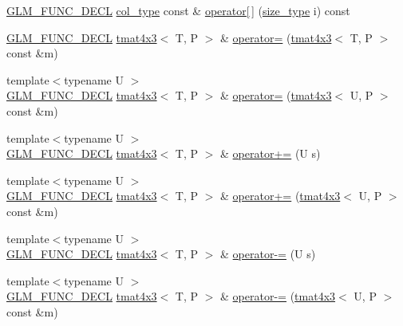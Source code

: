 \begin{DoxyCompactItemize}
\item 
\hyperlink{setup_8hpp_ab2d052de21a70539923e9bcbf6e83a51}{G\+L\+M\+\_\+\+F\+U\+N\+C\+\_\+\+D\+E\+CL} \hyperlink{structglm_1_1detail_1_1tmat4x3_a58afd510f7ab968e5a86e20f2f3979de}{col\+\_\+type} const  \& \hyperlink{structglm_1_1detail_1_1tmat4x3_a88f08d3121322921c25282c8983edfbf}{operator\mbox{[}$\,$\mbox{]}} (\hyperlink{structglm_1_1detail_1_1tmat4x3_aceab433265627d5787fe291463d19b91}{size\+\_\+type} i) const
\item 
\hyperlink{setup_8hpp_ab2d052de21a70539923e9bcbf6e83a51}{G\+L\+M\+\_\+\+F\+U\+N\+C\+\_\+\+D\+E\+CL} \hyperlink{structglm_1_1detail_1_1tmat4x3}{tmat4x3}$<$ T, P $>$ \& \hyperlink{structglm_1_1detail_1_1tmat4x3_a7d7570c16297f45b77cda4686e2d7725}{operator=} (\hyperlink{structglm_1_1detail_1_1tmat4x3}{tmat4x3}$<$ T, P $>$ const \&m)
\item 
{\footnotesize template$<$typename U $>$ }\\\hyperlink{setup_8hpp_ab2d052de21a70539923e9bcbf6e83a51}{G\+L\+M\+\_\+\+F\+U\+N\+C\+\_\+\+D\+E\+CL} \hyperlink{structglm_1_1detail_1_1tmat4x3}{tmat4x3}$<$ T, P $>$ \& \hyperlink{structglm_1_1detail_1_1tmat4x3_a78d228bf3b4923aaf3514d63d4bb4afd}{operator=} (\hyperlink{structglm_1_1detail_1_1tmat4x3}{tmat4x3}$<$ U, P $>$ const \&m)
\item 
{\footnotesize template$<$typename U $>$ }\\\hyperlink{setup_8hpp_ab2d052de21a70539923e9bcbf6e83a51}{G\+L\+M\+\_\+\+F\+U\+N\+C\+\_\+\+D\+E\+CL} \hyperlink{structglm_1_1detail_1_1tmat4x3}{tmat4x3}$<$ T, P $>$ \& \hyperlink{structglm_1_1detail_1_1tmat4x3_a1708ebf2fc22d00a114f77794da8bc22}{operator+=} (U s)
\item 
{\footnotesize template$<$typename U $>$ }\\\hyperlink{setup_8hpp_ab2d052de21a70539923e9bcbf6e83a51}{G\+L\+M\+\_\+\+F\+U\+N\+C\+\_\+\+D\+E\+CL} \hyperlink{structglm_1_1detail_1_1tmat4x3}{tmat4x3}$<$ T, P $>$ \& \hyperlink{structglm_1_1detail_1_1tmat4x3_a2b0c10c2d6d2183c6dc36027028fa8bd}{operator+=} (\hyperlink{structglm_1_1detail_1_1tmat4x3}{tmat4x3}$<$ U, P $>$ const \&m)
\item 
{\footnotesize template$<$typename U $>$ }\\\hyperlink{setup_8hpp_ab2d052de21a70539923e9bcbf6e83a51}{G\+L\+M\+\_\+\+F\+U\+N\+C\+\_\+\+D\+E\+CL} \hyperlink{structglm_1_1detail_1_1tmat4x3}{tmat4x3}$<$ T, P $>$ \& \hyperlink{structglm_1_1detail_1_1tmat4x3_afe60f638ecc619992856f0775383be8c}{operator-\/=} (U s)
\item 
{\footnotesize template$<$typename U $>$ }\\\hyperlink{setup_8hpp_ab2d052de21a70539923e9bcbf6e83a51}{G\+L\+M\+\_\+\+F\+U\+N\+C\+\_\+\+D\+E\+CL} \hyperlink{structglm_1_1detail_1_1tmat4x3}{tmat4x3}$<$ T, P $>$ \& \hyperlink{structglm_1_1detail_1_1tmat4x3_ac22917356357c54fc3d560b53b7d882c}{operator-\/=} (\hyperlink{structglm_1_1detail_1_1tmat4x3}{tmat4x3}$<$ U, P $>$ const \&m)

\end{DoxyCompactItemize}
